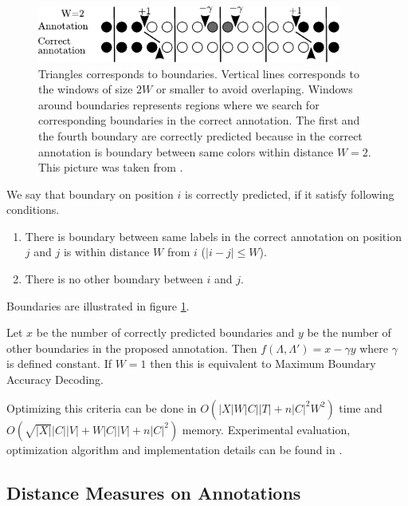 \begin{figure}
\begin{center}
\includegraphics[width=10cm]{../figures/HERDbuddy.pdf}
\end{center}
\caption[Highest Expected Reward Decoding explanation]{
Triangles corresponds to boundaries. Vertical lines corresponds to the windows
of size $2W$ or smaller to avoid overlaping. Windows around boundaries
represents regions where we search for corresponding boundaries in the correct
annotation.
The first and the fourth boundary are correctly predicted because in the correct
annotation is boundary between same colors within distance $W=2$.
This picture was taken from \cite{Nanasi2010mgr}.
}\label{FIGURE:HERDBUDDY}
\end{figure}

We say that boundary on position $i$ is correctly predicted, if it satisfy
following conditions.
\begin{enumerate}
\item There is boundary between same labels in the correct annotation on position $j$ and $j$ is
within distance $W$ from $i$ ($|i-j|\leq W$).
\item There is no other boundary between $i$ and $j$. 
\end{enumerate}
Boundaries are illustrated in figure \ref{FIGURE:HERDBUDDY}. 

Let $x$ be the number of correctly
predicted boundaries and $y$ be the number of other boundaries in the proposed
annotation. Then $f(\Lambda,\Lambda')=x-\gamma y$ where $\gamma$ is defined
constant. If $W=1$ then this is equivalent to Maximum Boundary Accuracy
Decoding. 

Optimizing this criteria can be done in $O(|X|W|C||T| + n|C|^2W^2)$ time  and
$O(\sqrt{|X|}|C||V|+W|C||V|+n|C|^2)$ memory. Experimental evaluation,
optimization algorithm and implementation details can be found in
\cite{Nanasi2010mgr}.

\subsection{Distance Measures on Annotations}

